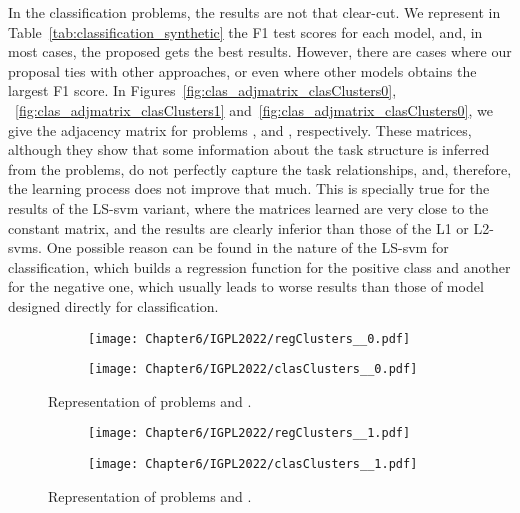 %
In the classification problems, the results are not that clear-cut.
We represent in Table~\ref{tab:classification_synthetic} the F1 test scores for each model, and, in most cases, the proposed  gets the best results.
However, there are cases where our proposal ties with other approaches, or even where other models obtains the largest F1 score.
%
In Figures~\ref{fig:clas_adjmatrix_clasClusters0}, ~\ref{fig:clas_adjmatrix_clasClusters1} and~\ref{fig:clas_adjmatrix_clasClusters0}, we give the adjacency matrix for problems ,  and , respectively.
%
These matrices, although they show that some information about the task structure is inferred from the problems, do not perfectly capture the task relationships, and, therefore, the learning process does not improve that much.
This is specially true for the results of the LS-\acrshort{svm} variant, where the matrices learned are very close to the constant matrix, and the results are clearly inferior than those of the L1 or L2-\acrshort{svms}.
One possible reason can be found in the nature of the LS-\acrshort{svm} for classification, which builds a regression function for the positive class and another for the negative one, which usually leads to worse results than those of model designed directly for classification.

%

\begin{figure}[t!]
    \centering
    \begin{subfigure}[b]{0.49\textwidth}
        \centering
        \texttt{[image: Chapter6/IGPL2022/regClusters\_\_0.pdf]}
        \caption{}
        \label{regClusters0}
    \end{subfigure}
    \hfill
    \begin{subfigure}[b]{0.49\textwidth}
        \centering
        \texttt{[image: Chapter6/IGPL2022/clasClusters\_\_0.pdf]}
        \caption{}
        \label{clasClusters0}
    \end{subfigure}
    \caption{Representation of problems  and .}
\end{figure}


\begin{figure}[t!]
    \centering
    \begin{subfigure}[b]{0.49\textwidth}
        \centering
        \texttt{[image: Chapter6/IGPL2022/regClusters\_\_1.pdf]}
        \caption{}
        \label{regClusters1}
    \end{subfigure}
    \hfill
    \begin{subfigure}[b]{0.49\textwidth}
        \centering
        \texttt{[image: Chapter6/IGPL2022/clasClusters\_\_1.pdf]}
        \caption{}
        \label{clasClusters1}
    \end{subfigure}
\caption{Representation of problems  and .}
\end{figure}


